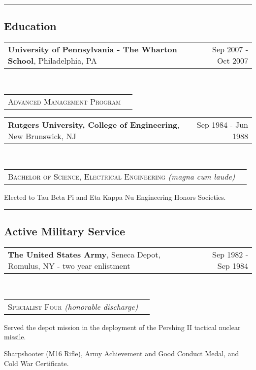 \documentclass[10pt,letterpaper]{extarticle}
\makeatletter
\newcommand{\headerrow}[2]
{\begin{tabular*}{\linewidth}{l@{\extracolsep{\fill}}r}
	#1 &
	#2 \\
\end{tabular*}}
\makeatother
\begin{document}

\hrule
\vspace{-1em}\subsection*{\Large Education}\vspace{-0.5em}

	\item[]
	\headerrow
		{\large \textbf{University of Pennsylvania - The Wharton School}, Philadelphia, PA}
		{Sep 2007 - Oct 2007}
	\\
	\headerrow
		{\large \textsc{Advanced Management Program}}
		{}
	\item[]
	\headerrow
		{\large \textbf{Rutgers University, College of Engineering}, New Brunswick, NJ}
		{Sep 1984 - Jun 1988}
	\\
	\headerrow
		{\large \textsc{Bachelor of Science, Electrical Engineering} \emph{(magna cum laude)}}
		{}
	\vspace{-2em}\begin{itemize*}
		\item Elected to Tau Beta Pi and Eta Kappa Nu Engineering Honors Societies.
	\end{itemize*}

\hrule
\vspace{-1em}\subsection*{\Large Active Military Service}\vspace{-0.5em}
	
	\item[]
	\headerrow
		{\large \textbf{The United States Army}, Seneca Depot, Romulus, NY - two year enlistment}
		{Sep 1982 - Sep 1984}
	\\
	\headerrow
		{\large \textsc{Specialist Four} \emph{(honorable discharge)}}
		{}
	\vspace{-2em}\begin{itemize*}
		\item Served the depot mission in the deployment of the Pershing II tactical nuclear
		missile.
		\item Sharpshooter (M16 Rifle), Army Achievement and Good Conduct Medal, and Cold War
		Certificate.
	\end{itemize*}
\end{document}
